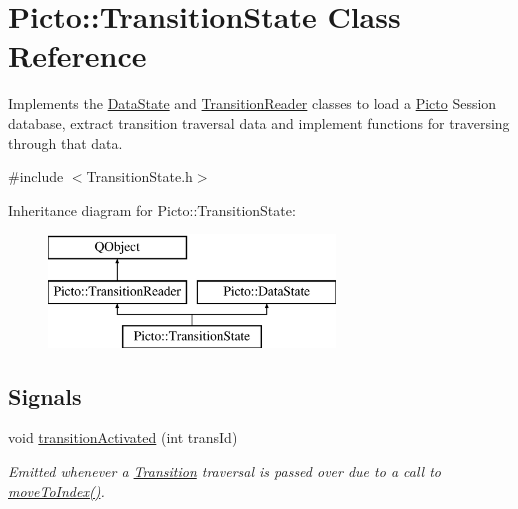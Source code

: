 \hypertarget{class_picto_1_1_transition_state}{\section{Picto\-:\-:Transition\-State Class Reference}
\label{class_picto_1_1_transition_state}
}


Implements the \hyperlink{class_picto_1_1_data_state}{Data\-State} and \hyperlink{class_picto_1_1_transition_reader}{Transition\-Reader} classes to load a \hyperlink{namespace_picto}{Picto} Session database, extract transition traversal data and implement functions for traversing through that data.  




{\ttfamily \#include $<$Transition\-State.\-h$>$}

Inheritance diagram for Picto\-:\-:Transition\-State\-:\begin{figure}[H]
\begin{center}
\leavevmode
\includegraphics[height=3.000000cm]{class_picto_1_1_transition_state}
\end{center}
\end{figure}
\subsection*{Signals}
\begin{DoxyCompactItemize}
\item 
void \hyperlink{class_picto_1_1_transition_state_a64bfe3dca43f7a2302b8a26a41f9b743}{transition\-Activated} (int trans\-Id)
\begin{DoxyCompactList}\small\item\em Emitted whenever a \hyperlink{class_picto_1_1_transition}{Transition} traversal is passed over due to a call to \hyperlink{class_picto_1_1_transition_state_a9a21bdd8867aa905059d4495664735a7}{move\-To\-Index()}. \end{DoxyCompactList}\end{DoxyCompactItemize}
